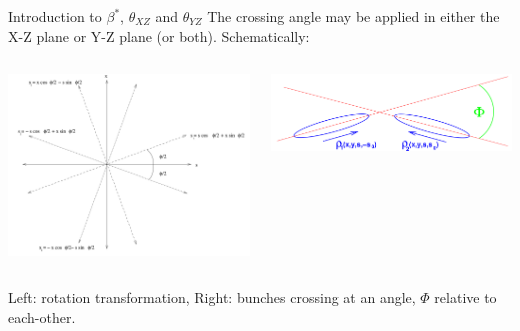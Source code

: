 \begin{frame}{Introduction to $\beta^{*}$,  $\theta_{XZ}$ and $\theta_{YZ}$}
The crossing angle may be applied in either the X-Z plane or Y-Z plane (or
both). Schematically:\\ 
\begin{columns}[T] %
\begin{column}[T]{5cm} %
\includegraphics[width=\linewidth,height=\textheight,keepaspectratio]{../HourglassIntro/figs/bunch_rotation.png}
\end{column}
\begin{column}[T]{5cm} %
\includegraphics[width=\linewidth,height=\textheight,keepaspectratio]{../HourglassIntro/figs/xing_bunch.png}
\end{column}
\end{columns}
Left: rotation transformation, Right: bunches crossing at an angle, $\Phi$ relative to each-other.
\end{frame}

